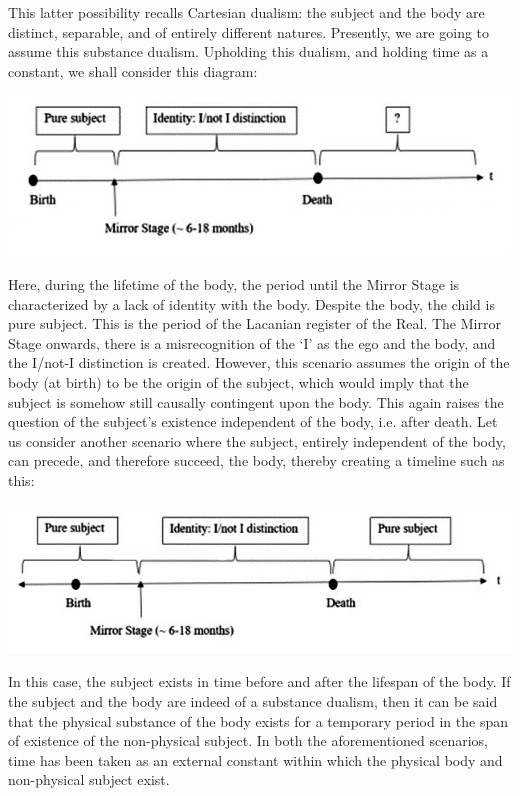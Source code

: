 This latter possibility recalls Cartesian dualism: the subject and the
body are distinct, separable, and of entirely different natures.
Presently, we are going to assume this substance dualism. Upholding this
dualism, and holding time as a constant, we shall consider this diagram:
\begin{center}
\includegraphics[scale = 0.45]{nathdiagram}
\end{center}
Here,
during the lifetime of the body, the period until the Mirror Stage is
characterized by a lack of identity with the body. Despite the body, the child is pure subject.
This is the period of the Lacanian register of the Real. The Mirror
Stage onwards, there is a misrecognition of the `I' as the ego and the
body, and the I/not-I distinction is created. However, this scenario
assumes the origin of the body (at birth) to be the origin of the
subject, which would imply that the subject is somehow still causally
contingent upon the body. This again raises the question of the
subject's existence independent of the body, i.e. after death. Let us
consider another scenario where the subject, entirely independent of the
body, can precede, and therefore succeed, the body, thereby creating a
timeline such as this:
\begin{center}
\includegraphics[scale = 0.45]{nathdiagram2}
\end{center}
In this case, the subject exists in time before and after the lifespan
of the body. If the subject and the body are indeed of a substance
dualism, then it can be said that the physical substance of the body
exists for a temporary period in the span of existence of the
non-physical subject. In both the aforementioned scenarios, time has been taken as an external
constant within which the physical body and non-physical subject exist.

